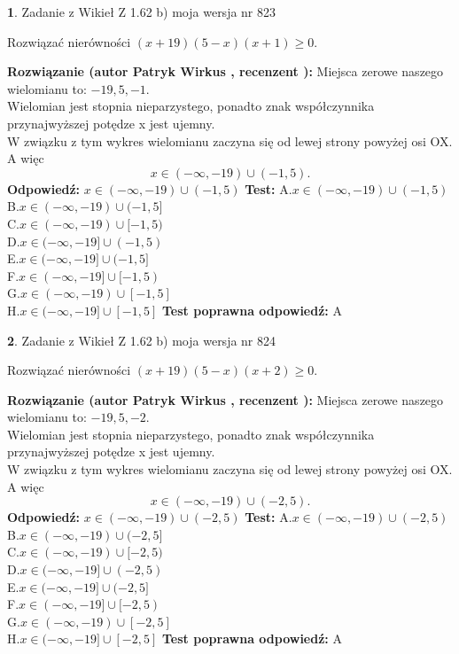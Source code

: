 \documentclass[12pt, a4paper]{article}
\theoremstyle{definition} %
\newtheorem{zad}{}
\newcommand{\zadStart}[1]{\begin{zad}#1\newline}
\newcommand{\zadStop}{\end{zad}}
\newcommand{\rozwStart}[2]{\noindent \textbf{Rozwiązanie (autor #1 , recenzent #2): }\newline}
\newcommand{\rozwStop}{\newline}
\newcommand{\odpStart}{\noindent \textbf{Odpowiedź:}\newline}
\newcommand{\odpStop}{\newline}
\newcommand{\testStart}{\noindent \textbf{Test:}\newline}
\newcommand{\testStop}{\newline}
\newcommand{\kluczStart}{\noindent \textbf{Test poprawna odpowiedź:}\newline}
\newcommand{\kluczStop}{\newline}
\begin{document}
\zadStart{Zadanie z Wikieł Z 1.62 b) moja wersja nr 823}

Rozwiązać nierówności $(x+19)(5-x)(x+1)\ge0$.
\zadStop
\rozwStart{Patryk Wirkus}{}
Miejsca zerowe naszego wielomianu to: $-19, 5, -1$.\\
Wielomian jest stopnia nieparzystego, ponadto znak współczynnika przy\linebreak najwyższej potędze x jest ujemny.\\ W związku z tym wykres wielomianu zaczyna się od lewej strony powyżej osi OX. A więc $$x \in (-\infty,-19) \cup (-1,5).$$
\rozwStop
\odpStart
$x \in (-\infty,-19) \cup (-1,5)$
\odpStop
\testStart
A.$x \in (-\infty,-19) \cup (-1,5)$\\
B.$x \in (-\infty,-19) \cup (-1,5]$\\
C.$x \in (-\infty,-19) \cup [-1,5)$\\
D.$x \in (-\infty,-19] \cup (-1,5)$\\
E.$x \in (-\infty,-19] \cup (-1,5]$\\
F.$x \in (-\infty,-19] \cup [-1,5)$\\
G.$x \in (-\infty,-19) \cup [-1,5]$\\
H.$x \in (-\infty,-19] \cup [-1,5]$
\testStop
\kluczStart
A
\kluczStop



\zadStart{Zadanie z Wikieł Z 1.62 b) moja wersja nr 824}

Rozwiązać nierówności $(x+19)(5-x)(x+2)\ge0$.
\zadStop
\rozwStart{Patryk Wirkus}{}
Miejsca zerowe naszego wielomianu to: $-19, 5, -2$.\\
Wielomian jest stopnia nieparzystego, ponadto znak współczynnika przy\linebreak najwyższej potędze x jest ujemny.\\ W związku z tym wykres wielomianu zaczyna się od lewej strony powyżej osi OX. A więc $$x \in (-\infty,-19) \cup (-2,5).$$
\rozwStop
\odpStart
$x \in (-\infty,-19) \cup (-2,5)$
\odpStop
\testStart
A.$x \in (-\infty,-19) \cup (-2,5)$\\
B.$x \in (-\infty,-19) \cup (-2,5]$\\
C.$x \in (-\infty,-19) \cup [-2,5)$\\
D.$x \in (-\infty,-19] \cup (-2,5)$\\
E.$x \in (-\infty,-19] \cup (-2,5]$\\
F.$x \in (-\infty,-19] \cup [-2,5)$\\
G.$x \in (-\infty,-19) \cup [-2,5]$\\
H.$x \in (-\infty,-19] \cup [-2,5]$
\testStop
\kluczStart
A
\kluczStop
\end{document}
